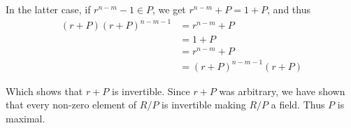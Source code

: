 \documentclass[12pt]{exam}
\theoremstyle{plain} %
\theoremstyle{definition} %
\theoremstyle{remark} %
\begin{document}
\begin{questions}
\begin{solution}
    In the latter case, if $r^{n-m} - 1 \in P$, we get $r^{n-m} + P =
    1 + P$, and thus
    \begin{align*}
      (r + P)(r + P)^{n - m - 1} &= r^{n - m} + P \\
      &= 1 + P \\
      &= r^{n - m} + P \\
      &= (r + P)^{n - m - 1}(r + P)
    \end{align*}
  \end{solution}
  Which shows that $r + P$ is invertible. Since $r + P$ was
  arbitrary, we have shown that every non-zero element of $R/P$ is
  invertible making $R/P$ a field. Thus $P$ is maximal.
\end{questions}
\printbibliography[heading=bibintoc]
\end{document}
